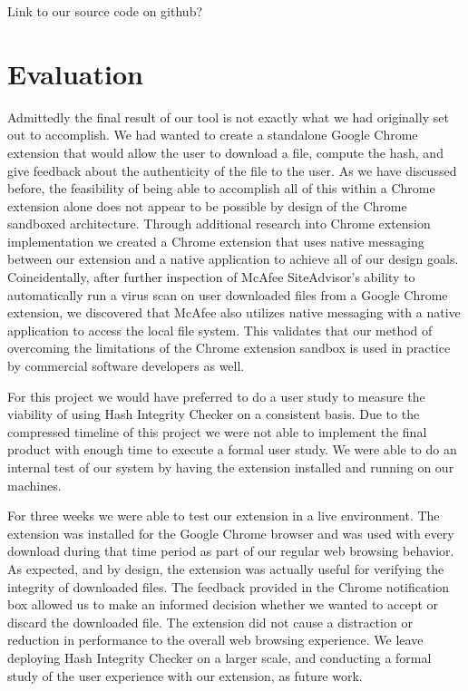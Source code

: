 \documentclass[letterpaper,twocolumn,10pt]{article}
\begin{document}
Link to our source code on github?

\section{Evaluation}
Admittedly the final result of our tool is not exactly what we had originally set out to accomplish. We had wanted to create a standalone Google Chrome extension that would allow the user to download a file, compute the hash, and give feedback about the authenticity of the file to the user. As we have discussed before, the feasibility of being able to accomplish all of this within a Chrome extension alone does not appear to be possible by design of the Chrome sandboxed architecture. Through additional research into Chrome extension implementation we created a Chrome extension that uses native messaging between our extension and a native application to achieve all of our design goals. Coincidentally, after further inspection of McAfee SiteAdvisor's ability to automatically run a virus scan on user downloaded files from a Google Chrome extension, we discovered that McAfee also utilizes native messaging with a native application to access the local file system. This validates that our method of overcoming the limitations of the Chrome extension sandbox is used in practice by commercial software developers as well.

For this project we would have preferred to do a user study to measure the viability of using Hash Integrity Checker on a consistent basis. Due to the compressed timeline of this project we were not able to implement the final product with enough time to execute a formal user study. We were able to do an internal test of our system by having the extension installed and running on our machines.

For three weeks we were able to test our extension in a live environment. The extension was installed for the Google Chrome browser and was used with every download during that time period as part of our regular web browsing behavior. As expected, and by design, the extension was actually useful for verifying the integrity of downloaded files. The feedback provided in the Chrome notification box allowed us to make an informed decision whether we wanted to accept or discard the downloaded file. The extension did not cause a distraction or reduction in performance to the overall web browsing experience. We leave deploying Hash Integrity Checker on a larger scale, and conducting a formal study of the user experience with our extension, as future work.
\end{document}
